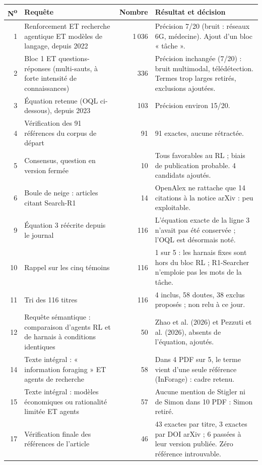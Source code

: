 \documentclass[11pt,a4paper]{article}
\begin{document}
\begin{small}
\begin{longtable}{@{}rp{6.4cm}rp{5.6cm}@{}}
\toprule
N\textsuperscript{o} & Requête & Nombre & Résultat et décision\\
\midrule\endhead
1 & Renforcement ET recherche agentique ET modèles de langage, depuis 2022 & 1\,036 & Précision 7/20 (bruit : réseaux 6G, médecine). Ajout d'un bloc « tâche ».\\
2 & Bloc 1 ET questions-réponses (multi-sauts, à forte intensité de connaissances) & 336 & Précision inchangée (7/20) : bruit multimodal, télédétection. Termes trop larges retirés, exclusions ajoutées.\\
3 & Équation retenue (OQL ci-dessous), depuis 2023 & 103 & Précision environ 15/20.\\
4 & Vérification des 91 références du corpus de départ & 91 & 91 exactes, aucune rétractée.\\
5 & Consensus, question en version fermée & 10 & Tous favorables au RL ; biais de publication probable. 4 candidats ajoutés.\\
6 & Boule de neige : articles citant Search-R1 & 14 & OpenAlex ne rattache que 14 citations à la notice arXiv : peu exploitable.\\
9 & Équation 3 réécrite depuis le journal & 116 & L'équation exacte de la ligne 3 n'avait pas été conservée ; l'OQL est désormais noté.\\
10 & Rappel sur les cinq témoins & 116 & 1 sur 5 : les harnais fixes sont hors du bloc RL ; R1-Searcher n'emploie pas les mots de la tâche.\\
11 & Tri des 116 titres & 116 & 4 inclus, 58 doutes, 38 exclus proposés ; non relu à ce jour.\\
12 & Requête sémantique : comparaison d'agents RL et de harnais à conditions identiques & 50 & Zhao et al. (2026) et Pezzuti et al. (2026), absents de l'équation, ajoutés.\\
14 & Texte intégral : « information foraging » ET agents de recherche & 58 & Dans 4 PDF sur 5, le terme vient d'une seule référence (InForage) : cadre retenu.\\
15 & Texte intégral : modèles économiques ou rationalité limitée ET agents & 57 & Aucune mention de Stigler ni de Simon dans 10 PDF : Simon retiré.\\
17 & Vérification finale des références de l'article & 46 & 43 exactes par titre, 3 exactes par DOI arXiv ; 6 passées à leur version publiée. Zéro référence introuvable.\\

\end{longtable}
\end{small}
\end{document}
